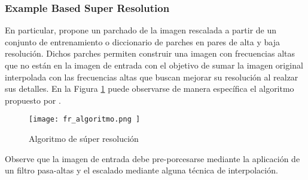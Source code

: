\subsubsection{Example Based Super Resolution}
\noindent
En particular, \cite{freeman} propone un parchado de la imagen rescalada a partir
de un conjunto de entrenamiento o diccionario de parches en pares de alta
y baja resolución. Dichos parches permiten construir una imagen con frecuencias
altas que no están en la imagen de entrada con el objetivo de sumar la imagen
original interpolada con las frecuencias altas que buscan mejorar su resolución
al realzar sus detalles. En la Figura \ref{fig:fr_algoritmo} puede observarse de
manera específica el algoritmo propuesto por \cite{freeman}.

\begin{figure}[H]
    \texttt{[image:  fr\_algoritmo.png ]}
    \centering
    \caption{ Algoritmo de súper resolución }
    \label{fig:fr_algoritmo}
\end{figure}

Observe que la imagen de entrada debe pre-porcesarse mediante la aplicación de un 
filtro pasa-altas y el escalado mediante alguna técnica de interpolación. 

